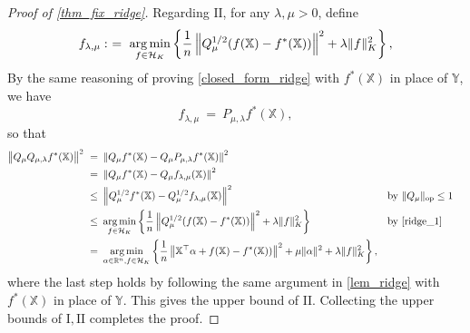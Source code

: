 \documentclass[11pt,twoside]{article}
\DeclareMathOperator*{\argmin}{arg\,min}
\def\YY{\mathbb{Y}}
\def\XX{\mathbb{X}}
\def\RR{\mathbb{R}}
\def\cH{\mathcal H}
\def\rI{\mathrm{I}}
\def\rII{\mathrm{II}}
\def\T{\top}
\def\op{{\rm op}}
\def\l{\left}
\def\r{\right}
\def\b{\big}
\begin{document}
\begin{proof}[Proof of \cref{thm_fix_ridge}]
Regarding $\rII$,  for any $\lambda,\mu>0$,
define 
\begin{align} \label{ridge_1}
f_{\lambda, \mu } 
: ~=~  \argmin_{ f \in \cH_K } \l\{ {1\over n} 
\l \|Q_\mu^{1/2} ( f(\XX) - f^*(\XX)) \r\|^2+\lambda \|f\|_K^2 \r\}, 
\end{align}
By the same reasoning of proving \eqref{closed_form_ridge}
with $f^*(\XX)$ in place of $\YY$, we have
\[
    f_{\lambda, \mu } ~=~ P_{\mu, \lambda} f^*(\XX),
\]
so that
\begin{align*}
\b\|  Q_\mu Q_{\mu,\lambda}  f^*(\XX)  \b \|^2 ~=~ & \l \|  Q_\mu    f^*(\XX) -  Q_\mu P_{\mu, \lambda}   f^*(\XX) \r\|^2  \\
~=~&  \l \|  Q_\mu    f^*(\XX) -  Q_\mu  f_{\lambda, \mu }(\XX ) \r\|^2 %
\\
~ \le~ &  \l \| Q_\mu^{1/2}    f^*(\XX) -Q_\mu ^{1/2}  f_{\lambda, \mu }(\XX ) \r\|^2 &&\text{by $\|  Q_\mu \|_\op \le 1$}\\
~ \le~ &  \argmin_{ f \in \cH_K } \l\{ {1\over n} 
\l \|Q_\mu^{1/2} ( f(\XX) - f^*(\XX)) \r\|^2+\lambda \|f\|_K^2 \r\} 
&&\text{by \eqref{ridge_1}}  \\
~=~  & \argmin_{\alpha\in \RR^n,  f \in \cH_K } \l\{ {1\over n} 
\l \| \XX^\T \alpha + f(\XX) - f^*(\XX)) \r\|^2+\mu\|\alpha \|^2 +\lambda \|f\|_K^2 \r\},  
\end{align*}
where the last step holds by 
following the same argument in \cref{lem_ridge} with $f^*(\XX)$ in place of $\YY$. This gives the upper bound of $\rII$. 
Collecting the upper bounds of $\rI, \rII$ completes the proof.
\end{proof}
\end{document}
